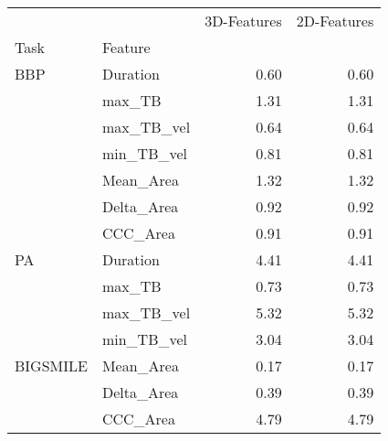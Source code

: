 \begin{tabular}{llrr}
\toprule
         &          &  3D-Features &  2D-Features \\
Task & Feature &              &              \\
\midrule
BBP & Duration &         0.60 &         0.60 \\
         & max\_TB &         1.31 &         1.31 \\
         & max\_TB\_vel &         0.64 &         0.64 \\
         & min\_TB\_vel &         0.81 &         0.81 \\
         & Mean\_Area &         1.32 &         1.32 \\
         & Delta\_Area &         0.92 &         0.92 \\
         & CCC\_Area &         0.91 &         0.91 \\
PA & Duration &         4.41 &         4.41 \\
         & max\_TB &         0.73 &         0.73 \\
         & max\_TB\_vel &         5.32 &         5.32 \\
         & min\_TB\_vel &         3.04 &         3.04 \\
BIGSMILE & Mean\_Area &         0.17 &         0.17 \\
         & Delta\_Area &         0.39 &         0.39 \\
         & CCC\_Area &         4.79 &         4.79 \\
\bottomrule
\end{tabular}
